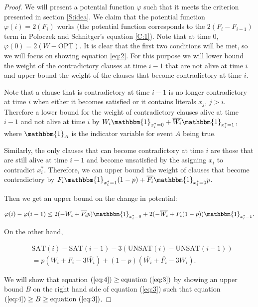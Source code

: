 \documentclass[11pt,letter]{article}
\numberwithin{theorem}{section}
\renewcommand{\phi}{\varphi}
\begin{document}
\begin{proof}
We will present a potential function $\phi$ such that it meets the criterion presented in section \ref{S:idea}. We claim that the potential function
$\phi(i) = 2(F_i)$ works (the potential function corresponds to the $2(F_i - F_{i-1})$ term in Poloczek and Schnitger's equation \ref{C:1}).
Note that at time $0$,
 $\phi(0) = 2(W-\textrm{OPT})$. It is clear that the first two conditions will be met, so we will focus on showing equation \ref{eq:2}.
 For this purpose we will lower bound the weight of the contradictory clauses at time $i-1$ that are not alive at time $i$
 and upper bound the weight of the clauses that become contradictory at time $i$.

Note that a clause that is contradictory at time $i-1$ is no longer contradictory at time $i$ when either it becomes satisfied
or it contains literals $x_j$, $j > i$. Therefore a lower bound for the weight of contradictory clauses alive at time $i-1$ and
 not alive at time $i$ by $W_i \mathbbm{1}_{x_i^* = 0} + \overline{W_i} \mathbbm{1}_{x_i^* = 1}$, where $\mathbbm{1}_A$ is the indicator variable for event $A$ being true.

Similarly, the only clauses that can become contradictory at time $i$ are those that are still alive at time $i-1$ and become unsatisfied
 by the asigning $x_i$ to contradict $x_i^*$. Therefore, we can upper bound the weight of clauses that become contradictory by
 $F_i \mathbbm{1}_{x_i^* = 1} (1-p) + \overline{F_i} \mathbbm{1}_{x_i^* = 0}p$.

Then we get an upper bound on the change in potential:

\begin{equation}
\label{eq:3}
\phi(i) - \phi(i-1) \leq 2(-W_i + \overline{F_i} p) \mathbbm{1}_{x_i^* = 0} + 2(-\overline{W_i} + F_i(1-p))\mathbbm{1}_{x_i^* = 1}.
\end{equation}

On the other hand,

\begin{equation}
\begin{aligned}
\label{eq:4}
& \textrm{SAT}(i) - \textrm{SAT}(i-1) - 3(\textrm{UNSAT}(i) - \textrm{UNSAT}(i-1)) \\
& = p(W_i + F_i - 3\overline{W_i}) + (1-p)(\overline{W_i} + \overline{F_i} - 3W_i).
\end{aligned}
\end{equation}

We will show that equation $(\ref{eq:4}) \geq \text{equation } (\ref{eq:3})$ by showing an upper bound $B$ on the right hand side of equation (\ref{eq:3}) such that equation $(\ref{eq:4}) \geq B \geq \text{equation } (\ref{eq:3})$.


\end{proof}
\end{document}
